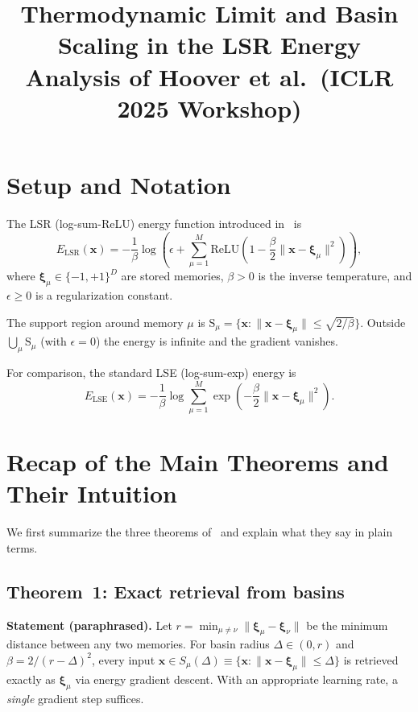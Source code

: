 \documentclass[11pt]{article}
\title{Thermodynamic Limit and Basin Scaling in the LSR Energy\\
\large Analysis of Hoover et al.\ (ICLR 2025 Workshop)}
\author{}
\date{}
\begin{document}
\maketitle

\section{Setup and Notation}

The LSR (log-sum-ReLU) energy function introduced in~\cite{Hoover2025} is
\begin{equation}\label{eq:lsr}
  E_{\mathrm{LSR}}(\mathbf{x})
  = -\frac{1}{\beta}\log\!\left(
      \epsilon + \sum_{\mu=1}^{M}
      \mathrm{ReLU}\!\left(1 - \frac{\beta}{2}\|\mathbf{x}-\boldsymbol{\xi}_\mu\|^2\right)
    \right),
\end{equation}
where $\boldsymbol{\xi}_\mu \in \{-1,+1\}^D$ are stored memories, $\beta > 0$
is the inverse temperature, and $\epsilon \geq 0$ is a regularization constant.

The support region around memory $\mu$ is
$\mathrm{S}_\mu = \{\mathbf{x} : \|\mathbf{x}-\boldsymbol{\xi}_\mu\| \leq \sqrt{2/\beta}\}$.
Outside $\bigcup_\mu \mathrm{S}_\mu$ (with $\epsilon = 0$) the energy is infinite
and the gradient vanishes.

For comparison, the standard LSE (log-sum-exp) energy is
\begin{equation}\label{eq:lse}
  E_{\mathrm{LSE}}(\mathbf{x})
  = -\frac{1}{\beta}\log\sum_{\mu=1}^{M}
    \exp\!\left(-\frac{\beta}{2}\|\mathbf{x}-\boldsymbol{\xi}_\mu\|^2\right).
\end{equation}

\section{Recap of the Main Theorems and Their Intuition}

We first summarize the three theorems of~\cite{Hoover2025} and explain what
they say in plain terms.

\subsection{Theorem~1: Exact retrieval from basins}

\textbf{Statement (paraphrased).}
Let $r = \min_{\mu\neq\nu}\|\boldsymbol{\xi}_\mu - \boldsymbol{\xi}_\nu\|$
be the minimum distance between any two memories.  For basin radius
$\Delta \in (0,r)$ and $\beta = 2/(r-\Delta)^2$, every input
$\mathbf{x}\in S_\mu(\Delta) \equiv \{\mathbf{x}:\|\mathbf{x}-\boldsymbol{\xi}_\mu\|\leq\Delta\}$
is retrieved exactly as $\boldsymbol{\xi}_\mu$ via energy gradient descent.
With an appropriate learning rate, a \emph{single} gradient step suffices.
\end{document}
